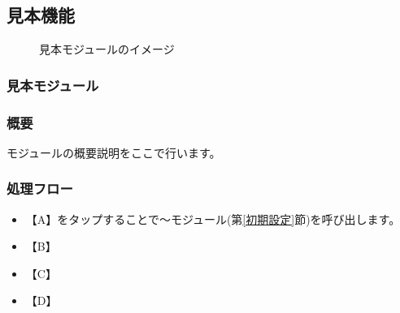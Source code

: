 \documentclass[a4j]{jarticle}
\begin{document}
\subsection{見本機能}
\begin{figure}[H]
    \begin{center}
    \caption {見本モジュールのイメージ}
    \label{functionselection}
    \end{center}
\end{figure}

\subsubsection{見本モジュール\label{見本}} %
\subsubsection*{概要}
モジュールの概要説明をここで行います。
\subsubsection*{処理フロー}
\begin{itemize}
\item 【A】をタップすることで～モジュール(第\ref{初期設定}節)を呼び出します。%
\item 【B】
\item 【C】
\item 【D】
\end{itemize}
\end{document}
